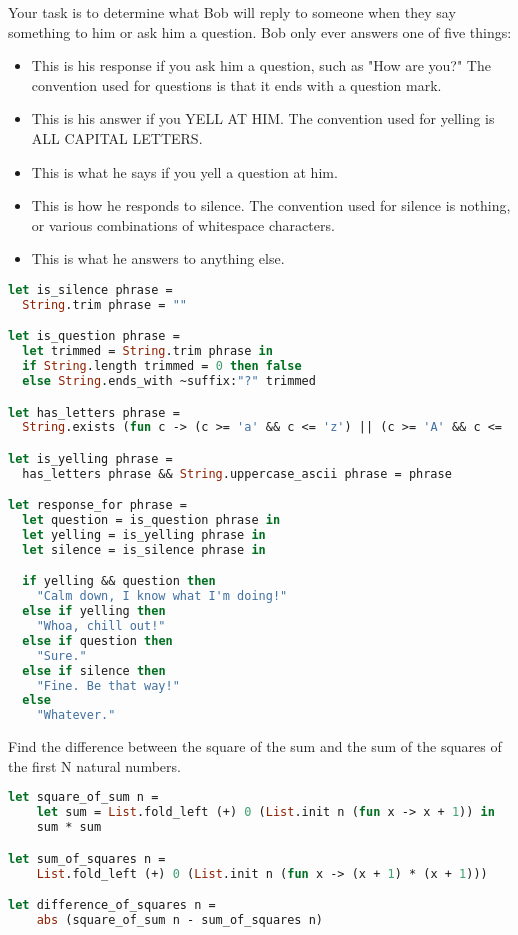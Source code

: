Your task is to determine what Bob will reply to someone when they say something to him or ask him a question.
Bob only ever answers one of five things:

\begin{itemize}
  \item {}
        This is his response if you ask him a question, such as "How are you?"
        The convention used for questions is that it ends with a question mark.
  \item {}
        This is his answer if you YELL AT HIM.
        The convention used for yelling is ALL CAPITAL LETTERS.
  \item {}
        This is what he says if you yell a question at him.
  \item {}
        This is how he responds to silence.
        The convention used for silence is nothing, or various combinations of whitespace characters.
  \item {}
        This is what he answers to anything else.
\end{itemize}

\begin{lstlisting}[language=OCaml]
let is_silence phrase =
  String.trim phrase = ""

let is_question phrase =
  let trimmed = String.trim phrase in
  if String.length trimmed = 0 then false
  else String.ends_with ~suffix:"?" trimmed

let has_letters phrase =
  String.exists (fun c -> (c >= 'a' && c <= 'z') || (c >= 'A' && c <= 'Z')) phrase

let is_yelling phrase =
  has_letters phrase && String.uppercase_ascii phrase = phrase

let response_for phrase =
  let question = is_question phrase in
  let yelling = is_yelling phrase in
  let silence = is_silence phrase in

  if yelling && question then
    "Calm down, I know what I'm doing!"
  else if yelling then
    "Whoa, chill out!"
  else if question then
    "Sure."
  else if silence then
    "Fine. Be that way!"
  else
    "Whatever."
\end{lstlisting}

Find the difference between the square of the sum and the sum of the squares of the first N natural numbers.

\begin{lstlisting}[language=OCaml]
let square_of_sum n = 
    let sum = List.fold_left (+) 0 (List.init n (fun x -> x + 1)) in
    sum * sum

let sum_of_squares n =
    List.fold_left (+) 0 (List.init n (fun x -> (x + 1) * (x + 1)))

let difference_of_squares n =
    abs (square_of_sum n - sum_of_squares n)
\end{lstlisting}

